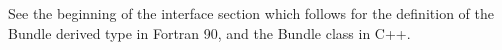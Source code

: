 

See the beginning of the interface section which
follows for the definition of the Bundle derived type
in Fortran 90, and the Bundle class in C++.

